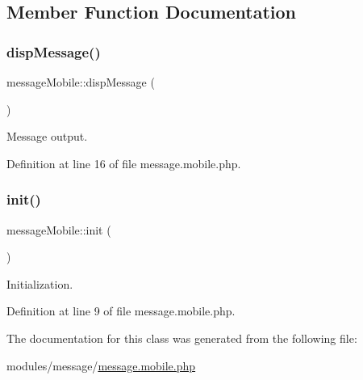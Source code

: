 \subsection{Member Function Documentation}
\mbox{\label{classmessageMobile_af0b28b049852fcf98444faceed1977fa}} 
\subsubsection{\texorpdfstring{disp\+Message()}{dispMessage()}}
{\footnotesize\ttfamily message\+Mobile\+::disp\+Message (\begin{DoxyParamCaption}{ }\end{DoxyParamCaption})}



Message output. 



Definition at line 16 of file message.\+mobile.\+php.

\mbox{\label{classmessageMobile_adbf0b398e93a9a202811c9149d51838c}} 
\subsubsection{\texorpdfstring{init()}{init()}}
{\footnotesize\ttfamily message\+Mobile\+::init (\begin{DoxyParamCaption}{ }\end{DoxyParamCaption})}



Initialization. 



Definition at line 9 of file message.\+mobile.\+php.



The documentation for this class was generated from the following file\+:\begin{DoxyCompactItemize}
\item 
modules/message/\hyperlink{message_8mobile_8php}{message.\+mobile.\+php}\end{DoxyCompactItemize}
